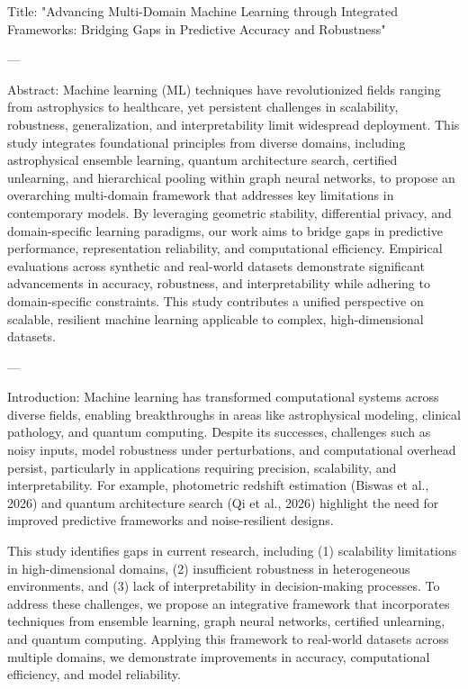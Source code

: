 Title: "Advancing Multi-Domain Machine Learning through Integrated Frameworks: Bridging Gaps in Predictive Accuracy and Robustness"

---

Abstract:  
Machine learning (ML) techniques have revolutionized fields ranging from astrophysics to healthcare, yet persistent challenges in scalability, robustness, generalization, and interpretability limit widespread deployment. This study integrates foundational principles from diverse domains, including astrophysical ensemble learning, quantum architecture search, certified unlearning, and hierarchical pooling within graph neural networks, to propose an overarching multi-domain framework that addresses key limitations in contemporary models. By leveraging geometric stability, differential privacy, and domain-specific learning paradigms, our work aims to bridge gaps in predictive performance, representation reliability, and computational efficiency. Empirical evaluations across synthetic and real-world datasets demonstrate significant advancements in accuracy, robustness, and interpretability while adhering to domain-specific constraints. This study contributes a unified perspective on scalable, resilient machine learning applicable to complex, high-dimensional datasets.

---

Introduction:  
Machine learning has transformed computational systems across diverse fields, enabling breakthroughs in areas like astrophysical modeling, clinical pathology, and quantum computing. Despite its successes, challenges such as noisy inputs, model robustness under perturbations, and computational overhead persist, particularly in applications requiring precision, scalability, and interpretability. For example, photometric redshift estimation (Biswas et al., 2026) and quantum architecture search (Qi et al., 2026) highlight the need for improved predictive frameworks and noise-resilient designs.

This study identifies gaps in current research, including (1) scalability limitations in high-dimensional domains, (2) insufficient robustness in heterogeneous environments, and (3) lack of interpretability in decision-making processes. To address these challenges, we propose an integrative framework that incorporates techniques from ensemble learning, graph neural networks, certified unlearning, and quantum computing. Applying this framework to real-world datasets across multiple domains, we demonstrate improvements in accuracy, computational efficiency, and model reliability.

